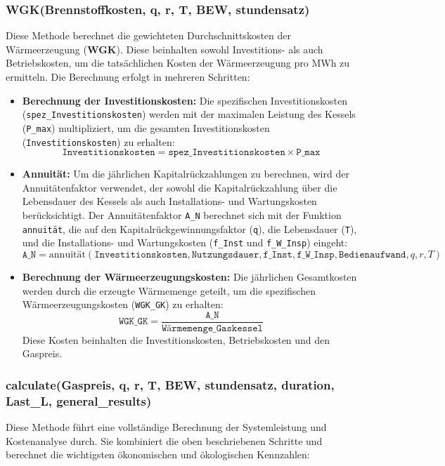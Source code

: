 \subsubsection{WGK(Brennstoffkosten, q, r, T, BEW, stundensatz)}
Diese Methode berechnet die gewichteten Durchschnittskosten der Wärmeerzeugung (\textbf{WGK}). Diese beinhalten sowohl Investitions- als auch Betriebskosten, um die tatsächlichen Kosten der Wärmeerzeugung pro MWh zu ermitteln. Die Berechnung erfolgt in mehreren Schritten:

\begin{itemize}
    \item \textbf{Berechnung der Investitionskosten:} Die spezifischen Investitionskosten (\texttt{spez\_Investitionskosten}) werden mit der maximalen Leistung des Kessels (\texttt{P\_max}) multipliziert, um die gesamten Investitionskosten (\texttt{Investitionskosten}) zu erhalten:
    \[
    \texttt{Investitionskosten} = \texttt{spez\_Investitionskosten} \times \texttt{P\_max}
    \]
    
    \item \textbf{Annuität:} Um die jährlichen Kapitalrückzahlungen zu berechnen, wird der Annuitätenfaktor verwendet, der sowohl die Kapitalrückzahlung über die Lebensdauer des Kessels als auch Installations- und Wartungskosten berücksichtigt. Der Annuitätenfaktor \texttt{A\_N} berechnet sich mit der Funktion \texttt{annuität}, die auf den Kapitalrückgewinnungsfaktor (\texttt{q}), die Lebensdauer (\texttt{T}), und die Installations- und Wartungskosten (\texttt{f\_Inst} und \texttt{f\_W\_Insp}) eingeht:
    \[
    \texttt{A\_N} = \text{annuität}(\texttt{Investitionskosten}, \texttt{Nutzungsdauer}, \texttt{f\_Inst}, \texttt{f\_W\_Insp}, \texttt{Bedienaufwand}, q, r, T)
    \]

    \item \textbf{Berechnung der Wärmeerzeugungskosten:} Die jährlichen Gesamtkosten werden durch die erzeugte Wärmemenge geteilt, um die spezifischen Wärmeerzeugungskosten (\texttt{WGK\_GK}) zu erhalten:
    \[
    \texttt{WGK\_GK} = \frac{\texttt{A\_N}}{\texttt{Wärmemenge\_Gaskessel}}
    \]
    Diese Kosten beinhalten die Investitionskosten, Betriebskosten und den Gaspreis.
\end{itemize}

\subsubsection{calculate(Gaspreis, q, r, T, BEW, stundensatz, duration, Last\_L, general\_results)}
Diese Methode führt eine vollständige Berechnung der Systemleistung und Kostenanalyse durch. Sie kombiniert die oben beschriebenen Schritte und berechnet die wichtigsten ökonomischen und ökologischen Kennzahlen:

